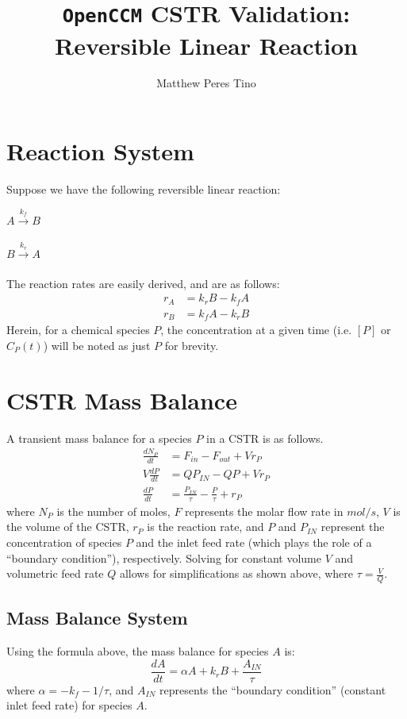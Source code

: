\documentclass[a4paper,12pt]{article}
\begin{document}
\title{\texttt{OpenCCM} CSTR Validation: Reversible Linear Reaction}
\author{Matthew Peres Tino}
\maketitle

\section{Reaction System}

Suppose we have the following reversible linear reaction:
\begin{center}
	$A\xrightarrow[]{k_f} B$
	
	$B\xrightarrow[]{k_r} A$
\end{center}

The reaction rates are easily derived, and are as follows:
\begin{align}
    r_A &= k_rB - k_fA \\
    r_B &= k_fA - k_rB 
\end{align}
Herein, for a chemical species $P$, the concentration at a given time (i.e. $[P]$ or $C_P(t)$) will be noted as just $P$ for brevity.

\section{CSTR Mass Balance}

A transient mass balance for a species $P$ in a CSTR is as follows. 
\begin{align}
    \frac{dN_P}{dt} &= F_{in} - F_{out} + Vr_P\\
    V\frac{dP}{dt} &= Q P_{IN} - QP + Vr_P \\
    \frac{dP}{dt} &= \frac{P_{IN}}{\tau} - \frac{P}{\tau} + r_P
\end{align}
where $N_P$ is the number of moles, $F$ represents the molar flow rate in $mol/s$, $V$ is the volume of the CSTR, $r_P$ is the reaction rate, and $P$ and $P_{IN}$ represent the concentration of species $P$ and the inlet feed rate (which plays the role of a ``boundary condition''), respectively.
Solving for constant volume $V$ and volumetric feed rate $Q$ allows for simplifications as shown above, where $\tau = \frac{V}{Q}$.

\newpage 
\subsection{Mass Balance System}
Using the formula above, the mass balance for species $A$ is: 
\begin{equation}
    \frac{dA}{dt} = \alpha A + k_r B + \frac{A_{IN}}{\tau}
\end{equation}
where $\alpha = -k_f - 1/\tau$, and $A_{IN}$ represents the ``boundary condition'' (constant inlet feed rate) for species $A$. 
\end{document}
